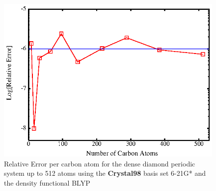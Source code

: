 \documentclass[prb,aps,nobibnotes,twocolumn,doublespace,twocolumngrid,superbib]{revtex4}
\begin{document}
\begin{figure}

\caption{\label{figure:ErrorPerN} Relative Error per carbon atom for the dense diamond
periodic system up to 512 atoms using the {\bf Crystal98} basis set 6-21G* \cite{C98Basis} and the 
density functional BLYP \cite{Becke93}}

{\centering \includegraphics{ErrorVsNumber_Diamond512.ps} \par} 
\end{figure}
\end{document}
